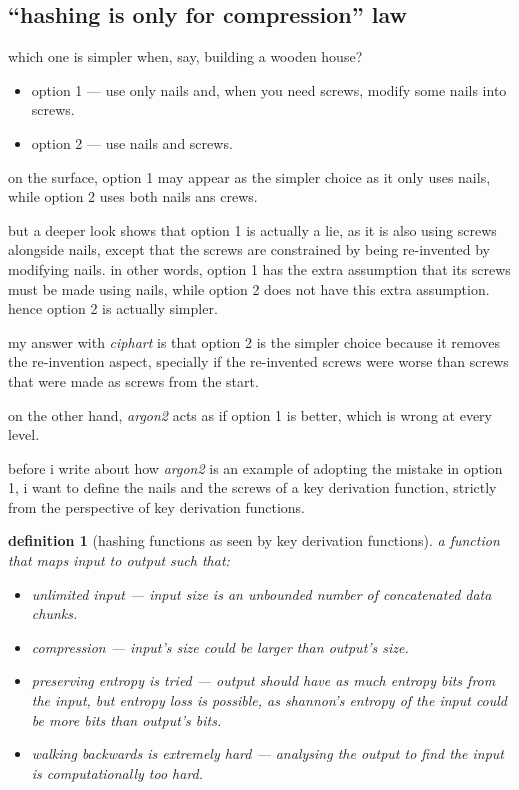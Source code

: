 \documentclass[twocolumn]{article}
\newtheorem{definition}{definition}[section]
\begin{document}
\subsection{``hashing is only for compression'' law}
which one is simpler when, say, building a wooden house?
\begin{itemize}
    \item option 1 --- use only nails and, when you need screws,
    modify some nails into screws.
    \item option 2 --- use nails and screws.
\end{itemize}

on the surface, option 1 may appear as the simpler choice as it only uses
nails, while option 2 uses both nails ans crews.

but a deeper look shows that option 1 is actually a lie, as it is also
using screws alongside nails, except that the screws are constrained by
being re-invented by modifying nails.  in other words, option 1 has the
extra assumption that its screws must be made using nails, while option 2
does not have this extra assumption.  hence option 2 is actually simpler.

my answer with \emph{ciphart} is that option 2 is the simpler choice
because it removes the re-invention aspect, specially if the re-invented
screws were worse than screws that were made as screws from the start.

on the other hand, \emph{argon2} acts as if option 1 is better, which is
wrong at every level.

before i write about how \emph{argon2} is an example of adopting the
mistake in option 1, i want to define the nails and the screws of a key
derivation function, strictly from the perspective of key derivation
functions.

\begin{definition}[hashing functions as seen by key derivation
functions]\label{def_kdf_hash}
    a function that maps input to output such that:
    \begin{itemize}
        \item unlimited input --- input size is an unbounded number of
        concatenated data chunks.

        \item compression --- input's size could be larger than output's
        size.

        \item preserving entropy is tried --- output should have as much
        entropy bits from the input, but entropy loss is possible, as
        shannon's entropy of the input could be more bits than output's
        bits.

        \item walking backwards is extremely hard --- analysing the output
        to find the input is computationally too hard.
    \end{itemize}
\end{definition}
\end{document}
